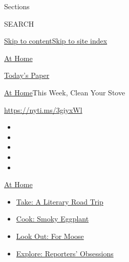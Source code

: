 Sections

SEARCH

\protect\hyperlink{site-content}{Skip to
content}\protect\hyperlink{site-index}{Skip to site index}

\href{https://www.nytimes3xbfgragh.onion/spotlight/at-home}{At Home}

\href{https://myaccount.nytimes3xbfgragh.onion/auth/login?response_type=cookie\&client_id=vi}{}

\href{https://www.nytimes3xbfgragh.onion/section/todayspaper}{Today's
Paper}

\href{/spotlight/at-home}{At Home}\textbar{}This Week, Clean Your Stove

\url{https://nyti.ms/3giyxWl}

\begin{itemize}
\item
\item
\item
\item
\item
\end{itemize}

\href{https://www.nytimes3xbfgragh.onion/spotlight/at-home?action=click\&pgtype=Article\&state=default\&region=TOP_BANNER\&context=at_home_menu}{At
Home}

\begin{itemize}
\tightlist
\item
  \href{https://www.nytimes3xbfgragh.onion/2020/07/28/books/time-for-a-literary-road-trip.html?action=click\&pgtype=Article\&state=default\&region=TOP_BANNER\&context=at_home_menu}{Take:
  A Literary Road Trip}
\item
  \href{https://www.nytimes3xbfgragh.onion/2020/07/29/magazine/bored-with-your-home-cooking-some-smoky-eggplant-will-fix-that.html?action=click\&pgtype=Article\&state=default\&region=TOP_BANNER\&context=at_home_menu}{Cook:
  Smoky Eggplant}
\item
  \href{https://www.nytimes3xbfgragh.onion/2020/07/27/travel/moose-michigan-isle-royale.html?action=click\&pgtype=Article\&state=default\&region=TOP_BANNER\&context=at_home_menu}{Look
  Out: For Moose}
\item
  \href{https://www.nytimes3xbfgragh.onion/interactive/2020/at-home/even-more-reporters-editors-diaries-lists-recommendations.html?action=click\&pgtype=Article\&state=default\&region=TOP_BANNER\&context=at_home_menu}{Explore:
  Reporters' Obsessions}
\end{itemize}

